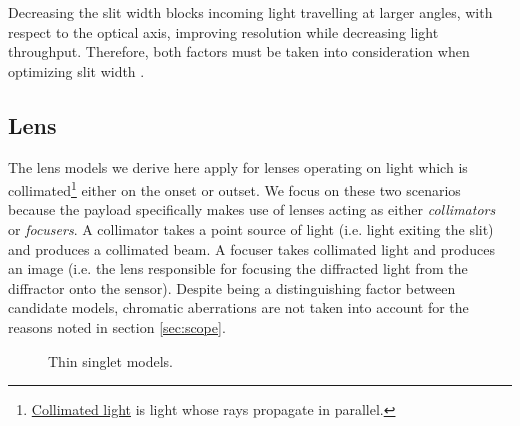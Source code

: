\documentclass{article}
\begin{document}
Decreasing the slit width blocks incoming light travelling at larger angles, with respect to the optical axis, improving resolution while decreasing light throughput. Therefore, both factors must be taken into consideration when optimizing slit width \cite{Optecks}.

\subsection{Lens}
The lens models we derive here apply for lenses operating on light which is collimated\footnote{\href{https://en.wikipedia.org/wiki/Collimated_beam}{Collimated light} is light whose rays propagate in parallel.} either on the onset or outset. We focus on these two scenarios because the payload specifically makes use of lenses acting as either \textit{collimators} or \textit{focusers}. A collimator takes a point source of light (i.e. light exiting the slit) and produces a collimated beam. A focuser takes collimated light and produces an image (i.e. the lens responsible for focusing the diffracted light from the diffractor onto the sensor). Despite being a distinguishing factor between candidate models, chromatic aberrations are not taken into account for the reasons noted in section \ref{sec:scope}.

\begin{figure}[H]
    \centering
    \qquad
    \caption{Thin singlet models.}
    \label{fig:thin-singlet-lens-models}
\end{figure}
\end{document}
